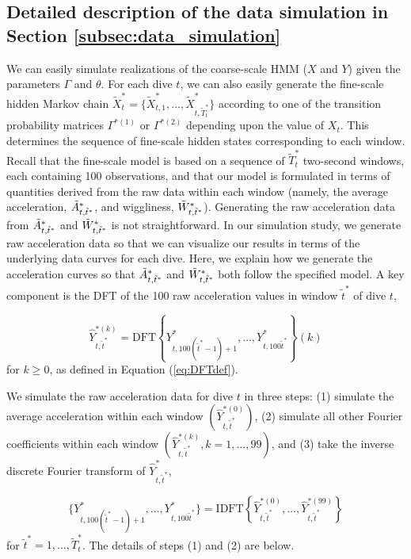 \subsection{Detailed description of the data simulation in Section \ref{subsec:data_simulation}}


\setcounter{equation}{7}   %

We can easily simulate realizations of the coarse-scale HMM ($X$ and $Y$) given the parameters $\Gamma$ and $\theta$. For each dive $t$, we can also easily generate the fine-scale hidden Markov chain $\tilde X^*_t = \big\{\tilde X^*_{t,1},\ldots,\tilde X^*_{t,\tilde T_t^*}\big\}$ according to one of the transition probability matrices $\Gamma^{*(1)}$ or $\Gamma^{*(2)}$ depending upon the value of $X_t$. This determines the sequence of fine-scale hidden states corresponding to each window. Recall that the fine-scale model is based on a sequence of $\tilde T_t^*$ two-second windows, each containing 100 observations, and that our model is formulated in terms of quantities derived from the raw data within each window (namely, the average acceleration, $\tilde{A}^*_{t,\tilde t^*}$, and wiggliness, $\tilde{W}^*_{ t,\tilde t^*}$). Generating the raw acceleration data from $\tilde{A}^*_{t,\tilde t^*}$ and $\tilde{W}^*_{ t,\tilde t^*}$ is not straightforward. In our simulation study, we generate raw acceleration data so that we can visualize our results in terms of the underlying data curves for each dive. Here, we explain how we generate the acceleration curves so that $\tilde{A}^*_{t,\tilde t^*}$ and $\tilde{W}^*_{ t,\tilde t^*}$ both follow the specified model. A key component is the DFT of the 100 raw acceleration values in window $\tilde{t}^*$ of dive $t$,

\[
    \hat{Y}^{*(k)}_{t,\tilde{t}^*}  = \mathrm{DFT}\left\{Y^*_{t,100 (\tilde{t}^*-1) + 1 },\ldots, Y^*_{t,100 \tilde{t}^*}\right\}(k)
\]
for $k \geq 0$, as defined in Equation (\ref{eq:DFTdef}).

We simulate the raw acceleration data for dive $t$ in three steps: (1) simulate the average acceleration within each window $\left(\hat Y^{*(0)}_{t,\tilde t^*}\right)$, (2) simulate all other Fourier coefficients within each window $\left(\hat Y^{*(k)}_{t,\tilde t^*}, k = 1,\ldots,99\right)$, and (3) take the inverse discrete Fourier transform of $\hat{Y}^*_{t,\tilde t^*}$,

\[
    \{Y^*_{t,100(\tilde t^* - 1) + 1},\ldots,Y^*_{t,100\tilde t^*}\} = \mathrm{IDFT}\left\{\hat{Y}^{*(0)}_{t,\tilde t^*},
    \ldots, \hat{Y}^{*(99)}_{t,\tilde t^*}\right\}
\]
for $\tilde t^* = 1,\ldots,\tilde T^*_t$. The details of steps (1) and (2) are below.

